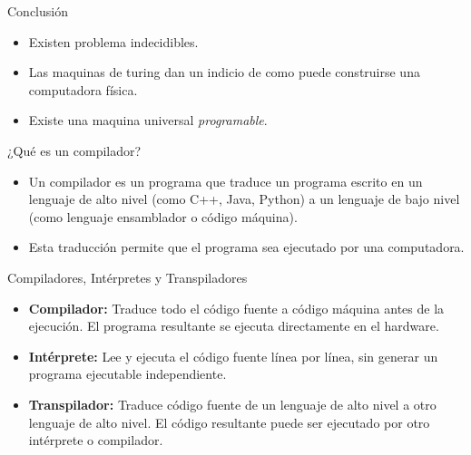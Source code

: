 \documentclass{beamer}
\begin{document}
		\begin{frame}{Conclusión}
		
		\begin{itemize}
			\item Existen problema indecidibles.
			\item Las maquinas de turing dan un indicio de como puede construirse una computadora física.
			\item Existe una maquina universal \textit{programable}.
		\end{itemize}
		
		
	\end{frame}
	
	
	
	\begin{frame}{¿Qué es un compilador?}
		
		\begin{itemize}
			\item Un compilador es un programa que traduce un programa escrito en un lenguaje de alto nivel (como C++, Java, Python) a un lenguaje de bajo nivel (como lenguaje ensamblador o código máquina).
			\item Esta traducción permite que el programa sea ejecutado por una computadora.
		\end{itemize}
		
	\end{frame}
	
	\begin{frame}{Compiladores, Intérpretes y Transpiladores}
		
		\begin{itemize}
			\item \textbf{Compilador:} Traduce todo el código fuente a código máquina antes de la ejecución. El programa resultante se ejecuta directamente en el hardware.
			\item \textbf{Intérprete:} Lee y ejecuta el código fuente línea por línea, sin generar un programa ejecutable independiente.
			\item \textbf{Transpilador:} Traduce código fuente de un lenguaje de alto nivel a otro lenguaje de alto nivel. El código resultante puede ser ejecutado por otro intérprete o compilador.
		\end{itemize}
		
	\end{frame}
	
\end{document}
